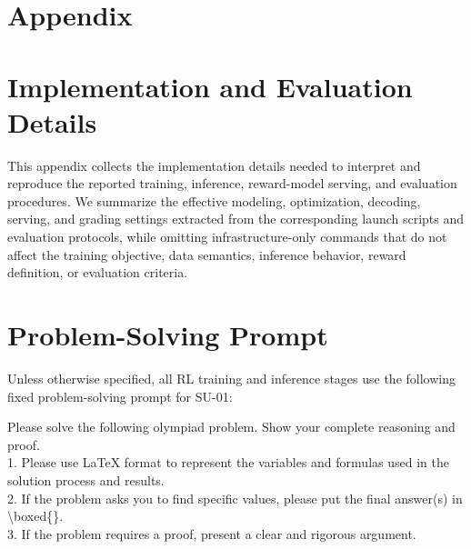 \clearpage

\section*{Appendix}

\startcontents[appendix]

\section{Implementation and Evaluation Details}
\label{app:training-details}

This appendix collects the implementation details needed to interpret and
reproduce the reported training, inference, reward-model serving, and evaluation
procedures. We summarize the effective modeling, optimization, decoding,
serving, and grading settings extracted from the corresponding launch scripts
and evaluation protocols, while omitting infrastructure-only commands that do
not affect the training objective, data semantics, inference behavior, reward
definition, or evaluation criteria.


\section{Problem-Solving Prompt}
\label{app:problem-solving-prompt}

Unless otherwise specified, all RL training and inference stages use the following fixed problem-solving prompt for SU-01:

\begin{mdframed}[style=mdpurplebox,frametitle={Problem-Solving Prompt}]
\small
\ttfamily
Please solve the following olympiad problem. Show your complete reasoning and proof.\\[2pt]
1. Please use LaTeX format to represent the variables and formulas used in the solution process and results.\\
2. If the problem asks you to find specific values, please put the final answer(s) in \textbackslash boxed\{\}.\\
3. If the problem requires a proof, present a clear and rigorous argument.
\end{mdframed}




